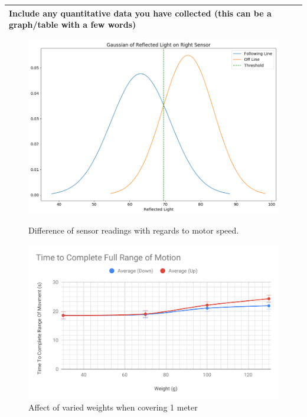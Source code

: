 \documentclass[a4paper]{article}
\newcommand{\colWidth}{141mm}
\begin{document}
\begin{center}
\newpage
\begin{tabular}{|p{\colWidth}|}
	\hline
	\cellcolor{blue!25}\large
	\textbf{Include any quantitative data you have collected (this can be a graph/table with a few words)}
  \\
  \hline
\end{tabular}

\begin{figure}[!htb]
  \includegraphics[width=\linewidth]{stay_on_line.png}
  \caption{Difference of sensor readings with regards to motor speed.}\label{fig:awesome_image1}
\endminipage\hfill
     \includegraphics[width=\textwidth]{time_range_of_motion.pdf}
     \caption{Affect of varied weights when covering 1 meter}\label{fig:awesome_image2}
\endminipage
\newline
\end{figure}


\end{center}
\end{document}
